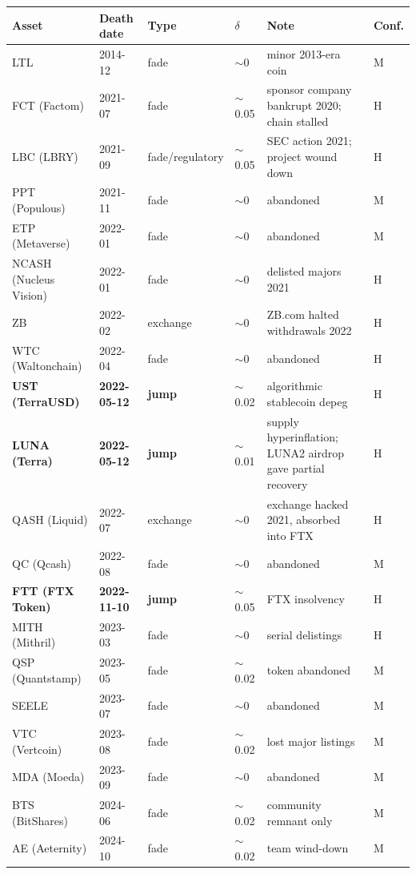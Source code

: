 \documentclass[11pt]{article}
\begin{document}
\begin{center}\footnotesize
\begin{longtable}{llllp{5.4cm}l}
\toprule
Asset & Death date & Type & $\delta$ & Note & Conf. \\
\midrule
\endhead
LTL & 2014-12 & fade & $\sim$0 & minor 2013-era coin & M \\
FCT (Factom) & 2021-07 & fade & $\sim$0.05 & sponsor company bankrupt 2020; chain stalled & H \\
LBC (LBRY) & 2021-09 & fade/regulatory & $\sim$0.05 & SEC action 2021; project wound down & H \\
PPT (Populous) & 2021-11 & fade & $\sim$0 & abandoned & M \\
ETP (Metaverse) & 2022-01 & fade & $\sim$0 & abandoned & M \\
NCASH (Nucleus Vision) & 2022-01 & fade & $\sim$0 & delisted majors 2021 & H \\
ZB & 2022-02 & exchange & $\sim$0 & ZB.com halted withdrawals 2022 & H \\
WTC (Waltonchain) & 2022-04 & fade & $\sim$0 & abandoned & H \\
\textbf{UST (TerraUSD)} & \textbf{2022-05-12} & \textbf{jump} & $\sim$0.02 & algorithmic stablecoin depeg & H \\
\textbf{LUNA (Terra)} & \textbf{2022-05-12} & \textbf{jump} & $\sim$0.01 & supply hyperinflation; LUNA2 airdrop gave partial recovery & H \\
QASH (Liquid) & 2022-07 & exchange & $\sim$0 & exchange hacked 2021, absorbed into FTX & H \\
QC (Qcash) & 2022-08 & fade & $\sim$0 & abandoned & M \\
\textbf{FTT (FTX Token)} & \textbf{2022-11-10} & \textbf{jump} & $\sim$0.05 & FTX insolvency & H \\
MITH (Mithril) & 2023-03 & fade & $\sim$0 & serial delistings & H \\
QSP (Quantstamp) & 2023-05 & fade & $\sim$0.02 & token abandoned & M \\
SEELE & 2023-07 & fade & $\sim$0 & abandoned & M \\
VTC (Vertcoin) & 2023-08 & fade & $\sim$0.02 & lost major listings & M \\
MDA (Moeda) & 2023-09 & fade & $\sim$0 & abandoned & M \\
BTS (BitShares) & 2024-06 & fade & $\sim$0.02 & community remnant only & M \\
AE (Aeternity) & 2024-10 & fade & $\sim$0.02 & team wind-down & M \\

\end{longtable}
\end{center}
\end{document}
